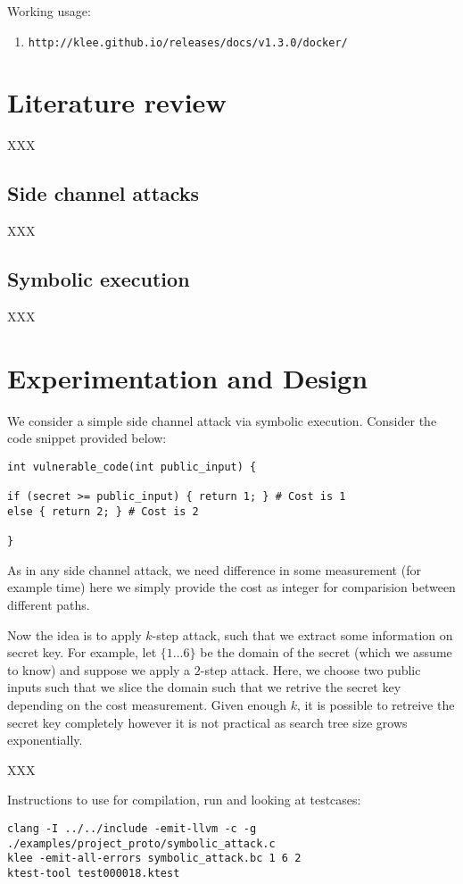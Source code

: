 \documentclass[11pt,a4paper,notitlepage]{article}
\begin{document}
Working usage:
\begin{enumerate}
    \item \texttt{http://klee.github.io/releases/docs/v1.3.0/docker/}
\end{enumerate}

\newpage

\section{Literature review}
\label{cha:literaturereview}

XXX

\subsection{Side channel attacks}
\label{sec:sidechannelattacks}

XXX 

\subsection{Symbolic execution}
\label{sec:symbolicexecution}

XXX

\newpage

\section{Experimentation and Design}

We consider a simple side channel attack via symbolic execution.
Consider the code snippet provided below:
\begin{verbatim}
int vulnerable_code(int public_input) {

if (secret >= public_input) { return 1; } # Cost is 1
else { return 2; } # Cost is 2

}
\end{verbatim}

As in any side channel attack, we need difference in some measurement (for example time) here we simply provide the cost as integer
for comparision between different paths.

Now the idea is to apply $k$-step attack, such that we extract some information on secret key.
For example, let $\{1 \dots 6\}$ be the domain of the secret (which we assume to know) and suppose we apply a $2$-step attack.
Here, we choose two public inputs such that we slice the domain such that we retrive the secret key depending on the cost measurement.
Given enough $k$, it is possible to retreive the secret key completely however it is not practical as search tree size grows exponentially.

XXX

Instructions to use for compilation, run and looking at testcases:
\begin{verbatim}
clang -I ../../include -emit-llvm -c -g ./examples/project_proto/symbolic_attack.c
klee -emit-all-errors symbolic_attack.bc 1 6 2
ktest-tool test000018.ktest
\end{verbatim}

\newpage




\end{document}
